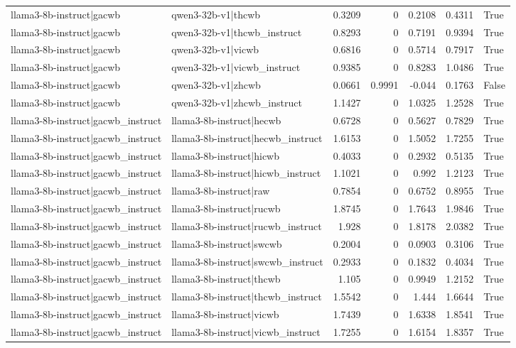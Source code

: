 \begin{table}
\begin{tabular}{l l r r r r l}
llama3-8b-instruct|gacwb & qwen3-32b-v1|thcwb & 0.3209 & 0 & 0.2108 & 0.4311 & True \\
llama3-8b-instruct|gacwb & qwen3-32b-v1|thcwb_instruct & 0.8293 & 0 & 0.7191 & 0.9394 & True \\
llama3-8b-instruct|gacwb & qwen3-32b-v1|vicwb & 0.6816 & 0 & 0.5714 & 0.7917 & True \\
llama3-8b-instruct|gacwb & qwen3-32b-v1|vicwb_instruct & 0.9385 & 0 & 0.8283 & 1.0486 & True \\
llama3-8b-instruct|gacwb & qwen3-32b-v1|zhcwb & 0.0661 & 0.9991 & -0.044 & 0.1763 & False \\
llama3-8b-instruct|gacwb & qwen3-32b-v1|zhcwb_instruct & 1.1427 & 0 & 1.0325 & 1.2528 & True \\
llama3-8b-instruct|gacwb_instruct & llama3-8b-instruct|hecwb & 0.6728 & 0 & 0.5627 & 0.7829 & True \\
llama3-8b-instruct|gacwb_instruct & llama3-8b-instruct|hecwb_instruct & 1.6153 & 0 & 1.5052 & 1.7255 & True \\
llama3-8b-instruct|gacwb_instruct & llama3-8b-instruct|hicwb & 0.4033 & 0 & 0.2932 & 0.5135 & True \\
llama3-8b-instruct|gacwb_instruct & llama3-8b-instruct|hicwb_instruct & 1.1021 & 0 & 0.992 & 1.2123 & True \\
llama3-8b-instruct|gacwb_instruct & llama3-8b-instruct|raw & 0.7854 & 0 & 0.6752 & 0.8955 & True \\
llama3-8b-instruct|gacwb_instruct & llama3-8b-instruct|rucwb & 1.8745 & 0 & 1.7643 & 1.9846 & True \\
llama3-8b-instruct|gacwb_instruct & llama3-8b-instruct|rucwb_instruct & 1.928 & 0 & 1.8178 & 2.0382 & True \\
llama3-8b-instruct|gacwb_instruct & llama3-8b-instruct|swcwb & 0.2004 & 0 & 0.0903 & 0.3106 & True \\
llama3-8b-instruct|gacwb_instruct & llama3-8b-instruct|swcwb_instruct & 0.2933 & 0 & 0.1832 & 0.4034 & True \\
llama3-8b-instruct|gacwb_instruct & llama3-8b-instruct|thcwb & 1.105 & 0 & 0.9949 & 1.2152 & True \\
llama3-8b-instruct|gacwb_instruct & llama3-8b-instruct|thcwb_instruct & 1.5542 & 0 & 1.444 & 1.6644 & True \\
llama3-8b-instruct|gacwb_instruct & llama3-8b-instruct|vicwb & 1.7439 & 0 & 1.6338 & 1.8541 & True \\
llama3-8b-instruct|gacwb_instruct & llama3-8b-instruct|vicwb_instruct & 1.7255 & 0 & 1.6154 & 1.8357 & True \\

\end{tabular}
\end{table}
